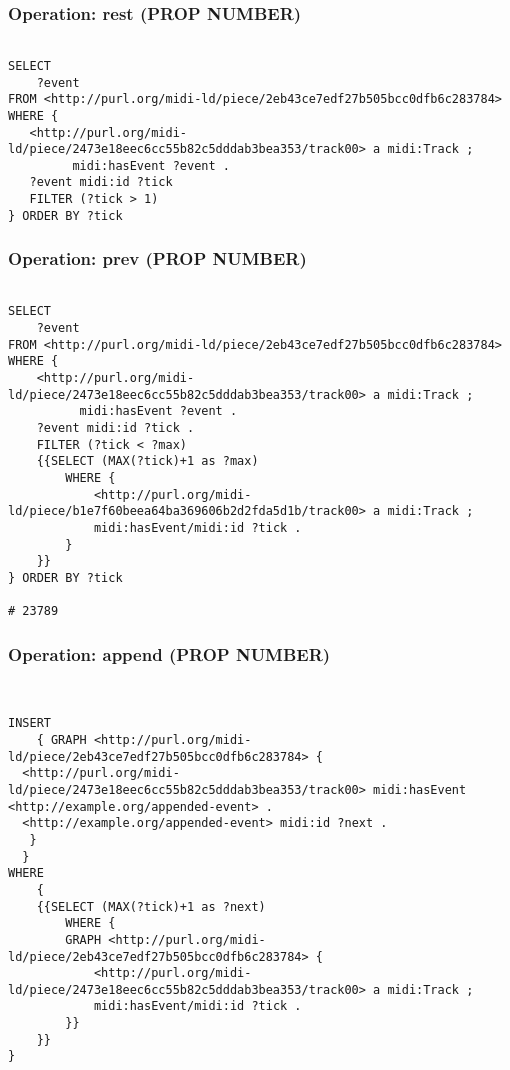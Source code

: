 \subsubsection{Operation: rest (PROP NUMBER)}
\label{query:PROP\-NUMBER:rest}

\begin{lstlisting}[language=sparql]

SELECT
	?event
FROM <http://purl.org/midi-ld/piece/2eb43ce7edf27b505bcc0dfb6c283784>
WHERE {
   <http://purl.org/midi-ld/piece/2473e18eec6cc55b82c5dddab3bea353/track00> a midi:Track ;
         midi:hasEvent ?event .
   ?event midi:id ?tick
   FILTER (?tick > 1)
} ORDER BY ?tick

\end{lstlisting}

\subsubsection{Operation: prev (PROP NUMBER)}
\label{query:PROP\-NUMBER:prev}

\begin{lstlisting}[language=sparql]

SELECT
	?event
FROM <http://purl.org/midi-ld/piece/2eb43ce7edf27b505bcc0dfb6c283784>
WHERE {
    <http://purl.org/midi-ld/piece/2473e18eec6cc55b82c5dddab3bea353/track00> a midi:Track ;
          midi:hasEvent ?event .
    ?event midi:id ?tick .
    FILTER (?tick < ?max)
	{{SELECT (MAX(?tick)+1 as ?max) 
		WHERE {
			<http://purl.org/midi-ld/piece/b1e7f60beea64ba369606b2d2fda5d1b/track00> a midi:Track ;
			midi:hasEvent/midi:id ?tick .
		}
	}}
} ORDER BY ?tick

# 23789

\end{lstlisting}

\subsubsection{Operation: append (PROP NUMBER)}
\label{query:PROP\-NUMBER:append}

\begin{lstlisting}[language=sparql]


INSERT
	{ GRAPH <http://purl.org/midi-ld/piece/2eb43ce7edf27b505bcc0dfb6c283784> {
  <http://purl.org/midi-ld/piece/2473e18eec6cc55b82c5dddab3bea353/track00> midi:hasEvent <http://example.org/appended-event> .
  <http://example.org/appended-event> midi:id ?next .
   }
  }
WHERE
	{
	{{SELECT (MAX(?tick)+1 as ?next) 
		WHERE {
		GRAPH <http://purl.org/midi-ld/piece/2eb43ce7edf27b505bcc0dfb6c283784> {
			<http://purl.org/midi-ld/piece/2473e18eec6cc55b82c5dddab3bea353/track00> a midi:Track ;
			midi:hasEvent/midi:id ?tick .
		}} 
	}}
}


\end{lstlisting}

